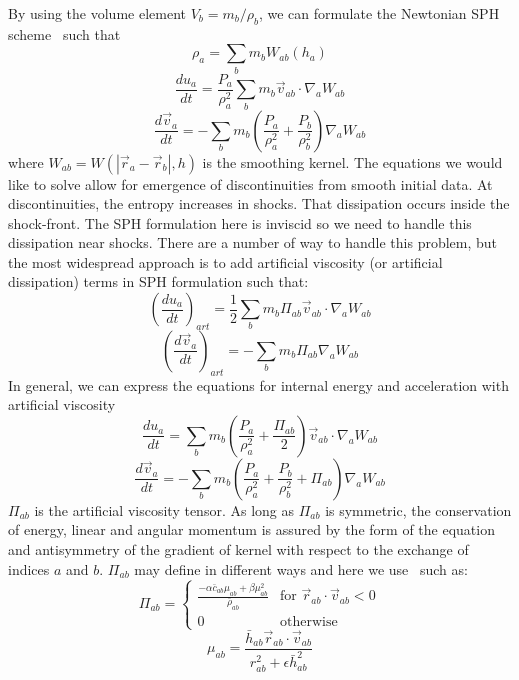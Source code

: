 By using the volume element $V_b = m_b / \rho_b$, we can formulate the Newtonian SPH scheme~\cite{rosswog2009} such that
\begin{equation}
\label{eq:rho}
\rho_a = \sum_b m_b W_{ab} (h_a)
\end{equation}
\begin{equation}
\frac{d u_a}{dt} = \frac{P_a}{\rho_a^2} \sum_b m_b \vec{v}_{ab} \cdot \nabla_a W_{ab} 
\end{equation}
\begin{equation}
\frac{d \vec{v}_a}{d t} = - \sum_b m_b \left(\frac{P_a}{\rho_a^2} + \frac{P_b}{\rho_b^2} \right) \nabla_a W_{ab}
\end{equation}
where $W_{ab} = W(| \vec{r}_a - \vec{r}_b |,h)$ is the smoothing kernel. 
The equations we would like to solve allow for emergence of discontinuities from smooth initial data. 
At discontinuities, the entropy increases in shocks. That dissipation occurs inside the shock-front. 
The SPH formulation here is inviscid so we need to handle this dissipation near shocks. 
There are a number of way to handle this problem, but the most widespread approach is to add artificial viscosity (or artificial dissipation) terms in SPH formulation such that:
\begin{equation}
\left(\frac{d u_a}{dt} \right)_{art} = \frac{1}{2} \sum_b m_b \Pi_{ab} \vec{v}_{ab} \cdot \nabla_a W_{ab}
\end{equation}
\begin{equation}
\left(\frac{d\vec{v}_a}{dt} \right)_{art} = - \sum_b m_b \Pi_{ab}\nabla_a W_{ab}
\end{equation}
In general, we can express the equations for internal energy and acceleration with artificial viscosity
\begin{equation}
\label{eq:intern}
\frac{d u_a}{dt} = \sum_b m_b \left(\frac{P_a}{\rho_a^2} + \frac{\Pi_{ab}}{2} \right) \vec{v}_{ab} \cdot \nabla_a W_{ab}
\end{equation}
\begin{equation}
\label{eq:velo}
\frac{d \vec{v}_a}{d t} = - \sum_b m_b \left(\frac{P_a}{\rho_a^2} + \frac{P_b}{\rho_b^2} + \Pi_{ab} \right) \nabla_a W_{ab}
\end{equation}
$\Pi_{ab}$ is the artificial viscosity tensor. 
As long as $\Pi_{ab}$ is symmetric, the conservation of energy, linear and angular momentum is assured by the form of the equation and antisymmetry of the gradient of kernel with respect to the exchange of indices $a$ and $b$. $\Pi_{ab}$ may define in different ways and here we use~\cite{Monaghan1983} such as: 
\begin{equation}
\Pi_{ab} = \begin{cases}
\frac{- \alpha \bar{c}_{ab} \mu_{ab} + \beta \mu_{ab}^2}{\bar{\rho}_{ab}} & \text{for $\vec{r}_{ab} \cdot \vec{v}_{ab} < 0$} \\
0 & \text{otherwise}
\end{cases}
\end{equation}
\begin{equation}
\mu_{ab} = \frac{\bar{h}_{ab} \vec{r}_{ab} \cdot \vec{v}_{ab}}{r^2_{ab} + \epsilon \bar{h}_{ab}^2}
\end{equation}

